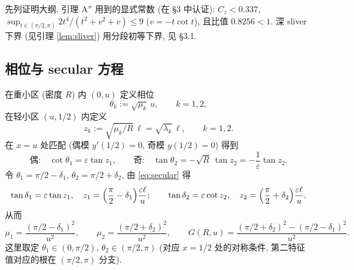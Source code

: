 \documentclass[UTF8]{ctexart}
\begin{document}
先列证明大纲. 引理 A$''$ 用到的显式常数 (在 §3 中认证):
$C_z<0.337$, $\sup_{t\in(\pi/2,\pi)}2t^4/(t^2+v^2+v)\le 9$ ($v=-t\cot t$), 且比值
$0.8256<1$. 深 sliver 下界 (见引理 \ref{lem:sliver}) 用分段初等下界, 见 §3.1.

\subsection{相位与 secular 方程}
在重小区 (密度 $R$) 内 $(0,u)$ 定义相位
\begin{equation}
	\theta_k:=\sqrt{\mu_k}\,u,\qquad k=1,2,
\end{equation}
在轻小区 $(u,1/2)$ 内定义
\begin{equation}
	z_k:=\sqrt{\mu_k/R}\,\ell=\sqrt{\lambda_k}\,\ell,\qquad k=1,2.
\end{equation}
在 $x=u$ 处匹配 (偶模 $y'(1/2)=0$, 奇模 $y(1/2)=0$) 得到
\begin{equation}
	\text{偶:}\quad \cot\theta_1=\varepsilon\tan z_1,
	\qquad
	\text{奇:}\quad \tan\theta_2=-\sqrt R\,\tan z_2=-\frac1\varepsilon\tan z_2.
	\label{eq:secular}
\end{equation}
令 $\theta_1=\pi/2-\delta_1$, $\theta_2=\pi/2+\delta_2$, 由 \eqref{eq:secular} 得
\begin{equation}
	\tan\delta_1=\varepsilon\tan z_1,\quad
	z_1=\Bigl(\frac\pi2-\delta_1\Bigr)\frac{\varepsilon\ell}{u};
	\qquad
	\tan\delta_2=\varepsilon\cot z_2,\quad
	z_2=\Bigl(\frac\pi2+\delta_2\Bigr)\frac{\varepsilon\ell}{u}.
	\label{eq:delta}
\end{equation}
从而
\begin{equation}
	\mu_1=\frac{(\pi/2-\delta_1)^2}{u^2},\qquad
	\mu_2=\frac{(\pi/2+\delta_2)^2}{u^2},\qquad
	G(R,u)=\frac{(\pi/2+\delta_2)^2-(\pi/2-\delta_1)^2}{u^2}.
	\label{eq:mu}
\end{equation}
这里取定 $\theta_1\in(0,\pi/2)$, $\theta_2\in(\pi/2,\pi)$ (对应 $x=1/2$ 处的对称条件,
第二特征值对应的根在 $(\pi/2,\pi)$ 分支).
\end{document}
